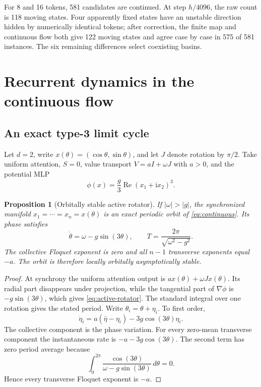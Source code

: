 \documentclass[11pt,a4paper]{article}
\newtheorem{proposition}[theorem]{Proposition}
\theoremstyle{definition}
\begin{document}
For 8 and 16 tokens, 581 candidates are continued. At step $h/4096$, the raw count is
118 moving states. Four apparently fixed states have an unstable direction hidden by
numerically identical tokens; after correction, the finite map and continuous flow
both give 122 moving states and agree case by case in 575 of 581 instances. The six
remaining differences select coexisting basins.

\section{Recurrent dynamics in the continuous flow}
\label{sec:attractors}

\subsection{An exact type-3 limit cycle}

Let $d=2$, write $x(\theta)=(\cos\theta,\sin\theta)$, and let $J$ denote rotation by
$\pi/2$.  Take uniform attention, $S=0$, value transport
$V=aI+\omega J$ with $a>0$, and the potential MLP
\begin{equation}
 \phi(x)=\frac{g}{3}\operatorname{Re}(x_1+\mathrm i x_2)^3.
 \label{eq:triwell-potential}
\end{equation}

\begin{proposition}[Orbitally stable active rotator]
\label{prop:active-rotator}
If $|\omega|>|g|$, the synchronized manifold
$x_1=\cdots=x_n=x(\theta)$ is an exact periodic orbit of
\eqref{eq:continuous}.  Its phase satisfies
\begin{equation}
 \dot\theta=\omega-g\sin(3\theta),\qquad
 T=\frac{2\pi}{\sqrt{\omega^2-g^2}}.
 \label{eq:active-rotator}
\end{equation}
The collective Floquet exponent is zero and all $n-1$ transverse exponents equal
$-a$.  The orbit is therefore locally orbitally asymptotically stable.
\end{proposition}

\begin{proof}
At synchrony the uniform attention output is
$a x(\theta)+\omega Jx(\theta)$.  Its radial part disappears under projection, while
the tangential part of $\nabla\phi$ is $-g\sin(3\theta)$, which gives
\eqref{eq:active-rotator}.  The standard integral over one rotation gives the stated
period.  Write $\theta_i=\theta+\eta_i$.  To first order,
\[
 \dot\eta_i=a(\bar\eta-\eta_i)-3g\cos(3\theta)\eta_i.
\]
The collective component is the phase variation.  For every zero-mean transverse
component the instantaneous rate is $-a-3g\cos(3\theta)$.  The second term has zero
period average because
\[
 \int_0^{2\pi}\frac{\cos(3\theta)}
 {\omega-g\sin(3\theta)}\,d\theta=0.
\]
Hence every transverse Floquet exponent is $-a$.
\end{proof}
\end{document}
